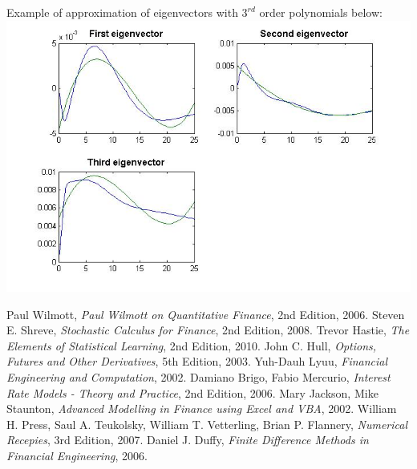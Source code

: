 \documentclass[11pt]{article} %
\begin{document}
Example of approximation of eigenvectors with $3^{rd}$ order polynomials below:\\
\includegraphics[scale=0.6]{fitting.jpg}\\

\begin{thebibliography}{9}
 Paul Wilmott, \emph{Paul Wilmott on Quantitative Finance}, 2nd Edition, 2006.
 Steven E. Shreve, \emph{Stochastic Calculus for Finance}, 2nd Edition, 2008.
 Trevor Hastie, \emph{The Elements of Statistical Learning}, 2nd Edition, 2010.
 John C. Hull, \emph{Options, Futures and Other Derivatives}, 5th Edition, 2003.
 Yuh-Dauh Lyuu, \emph{Financial Engineering and Computation}, 2002.
 Damiano Brigo, Fabio Mercurio, \emph{Interest Rate Models - Theory and Practice}, 2nd Edition, 2006.
 Mary Jackson, Mike Staunton, \emph{Advanced Modelling in Finance using Excel and VBA}, 2002.
 William H. Press, Saul A. Teukolsky, William T. Vetterling, Brian P. Flannery,  \emph{Numerical Recepies}, 3rd Edition, 2007.
 Daniel J. Duffy,  \emph{Finite Difference Methods in Financial Engineering}, 2006.

\end{thebibliography}
\end{document}
